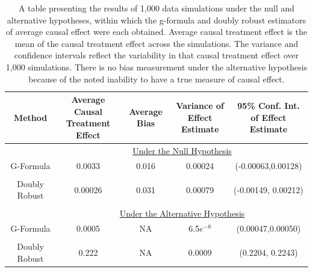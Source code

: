 \begin{table}[h!]
\centering
\begin{tabular}{c | c c c c }
Method & \shortstack{Average Causal \\ Treatment Effect} & Average Bias & \shortstack{Variance of \\ Effect Estimate} & \shortstack{95\% Conf. Int.\\ of Effect Estimate} \\
\hline 
& \multicolumn{4}{c}{\underline{Under the Null Hypothesis}} \\
G-Formula & 0.0033 & 0.016 & 0.00024&(-0.00063,0.00128)\\ \\ 
Doubly Robust & 0.00026 & 0.031& 0.00079 & (-0.00149, 0.00212)\\ \\ 
& \multicolumn{4}{c}{\underline{Under the Alternative Hypothesis}} \\
G-Formula & 0.0005 & NA& 6.5$e^{-8}$ &(0.00047,0.00050) \\ \\ 
Doubly Robust & 0.222 & NA & 0.0009& (0.2204, 0.2243)
\end{tabular} \\
\centering
\caption[Simulation results comparing the two methods]{A table presenting the results of 1,000 data simulations under the null and alternative hypotheses, within which the g-formula and doubly robust estimators of average causal effect were each obtained.  Average causal treatment effect is the mean of the causal treatment effect across the simulations.  The variance and confidence intervals reflect the variability in that causal treatment effect over 1,000 simulations. There is no bias measurement under the alternative hypothesis because of the noted inability to have a true measure of causal effect.\label{simdata}}
\end{table}

